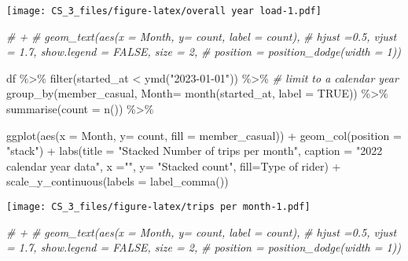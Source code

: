 \documentclass[
]{article}
\newenvironment{Shaded}{\begin{snugshade}}{\end{snugshade}}
\newcommand{\AttributeTok}[1]{\textcolor[rgb]{0.77,0.63,0.00}{#1}}
\newcommand{\CommentTok}[1]{\textcolor[rgb]{0.56,0.35,0.01}{\textit{#1}}}
\newcommand{\ConstantTok}[1]{\textcolor[rgb]{0.00,0.00,0.00}{#1}}
\newcommand{\FunctionTok}[1]{\textcolor[rgb]{0.00,0.00,0.00}{#1}}
\newcommand{\NormalTok}[1]{#1}
\newcommand{\SpecialCharTok}[1]{\textcolor[rgb]{0.00,0.00,0.00}{#1}}
\newcommand{\StringTok}[1]{\textcolor[rgb]{0.31,0.60,0.02}{#1}}
\begin{document}
\texttt{[image: CS\_3\_files/figure-latex/overall year load-1.pdf]}

\begin{Shaded}
\begin{Highlighting}[]
\CommentTok{\# +}
\CommentTok{\#   geom\_text(aes(x = Month, y= count, label = count),}
\CommentTok{\#       hjust =0.5, vjust = 1.7, show.legend = FALSE, size = 2,}
\CommentTok{\#       position = position\_dodge(width = 1))}
\end{Highlighting}
\end{Shaded}

\begin{Shaded}
\begin{Highlighting}[]
\NormalTok{df }\SpecialCharTok{\%\textgreater{}\%} 
  \FunctionTok{filter}\NormalTok{(started\_at }\SpecialCharTok{\textless{}} \FunctionTok{ymd}\NormalTok{(}\StringTok{"2023{-}01{-}01"}\NormalTok{)) }\SpecialCharTok{\%\textgreater{}\%} \CommentTok{\# limit to a calendar year}
  \FunctionTok{group\_by}\NormalTok{(member\_casual, }\AttributeTok{Month=}  \FunctionTok{month}\NormalTok{(started\_at, }\AttributeTok{label =} \ConstantTok{TRUE}\NormalTok{)) }\SpecialCharTok{\%\textgreater{}\%}
  \FunctionTok{summarise}\NormalTok{(}\AttributeTok{count =} \FunctionTok{n}\NormalTok{()) }\SpecialCharTok{\%\textgreater{}\%}

  \FunctionTok{ggplot}\NormalTok{(}\FunctionTok{aes}\NormalTok{(}\AttributeTok{x =}\NormalTok{ Month, }\AttributeTok{y=}\NormalTok{ count, }\AttributeTok{fill =}\NormalTok{ member\_casual)) }\SpecialCharTok{+}
  \FunctionTok{geom\_col}\NormalTok{(}\AttributeTok{position =} \StringTok{"stack"}\NormalTok{) }\SpecialCharTok{+}
  \FunctionTok{labs}\NormalTok{(}\AttributeTok{title =} \StringTok{"Stacked Number of trips per month"}\NormalTok{,}
       \AttributeTok{caption =} \StringTok{"2022 calendar year data"}\NormalTok{,}
       \AttributeTok{x =}\StringTok{""}\NormalTok{, }\AttributeTok{y=} \StringTok{"Stacked count"}\NormalTok{,}
       \AttributeTok{fill=}\StringTok{\textquotesingle{}Type of rider\textquotesingle{}}\NormalTok{) }\SpecialCharTok{+}
  \FunctionTok{scale\_y\_continuous}\NormalTok{(}\AttributeTok{labels =} \FunctionTok{label\_comma}\NormalTok{()) }
\end{Highlighting}
\end{Shaded}

\texttt{[image: CS\_3\_files/figure-latex/trips per month-1.pdf]}

\begin{Shaded}
\begin{Highlighting}[]
\CommentTok{\# +}
\CommentTok{\#   geom\_text(aes(x = Month, y= count, label = count),}
\CommentTok{\#       hjust =0.5, vjust = 1.7, show.legend = FALSE, size = 2,}
\CommentTok{\#       position = position\_dodge(width = 1))}
\end{Highlighting}
\end{Shaded}
\end{document}
